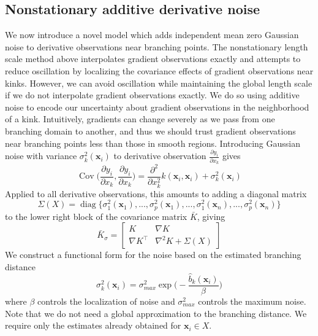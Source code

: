 \documentclass{article}
\newcommand{\mat}[1]{\begin{bmatrix}#1\end{bmatrix}}
\renewcommand{\vec}[1]{\mathbf{#1}}
\DeclareMathOperator{\Cov}{Cov}
\DeclareMathOperator{\diag}{diag}
\numberwithin{equation}{section}
\begin{document}
\subsection{Nonstationary additive derivative noise}
We now introduce a novel model which adds independent mean zero Gaussian noise to derivative observations near branching points. The nonstationary length scale method above interpolates gradient observations exactly and attempts to reduce oscillation by localizing the covariance effects of gradient observations near kinks. However, we can avoid oscillation while maintaining the global length scale if we do not interpolate gradient observations exactly. We do so using additive noise to encode our uncertainty about gradient observations in the neighborhood of a kink. Intuitively, gradients can change severely as we pass from one branching domain to another, and thus we should trust gradient observations near branching points less than those in smooth regions. Introducing Gaussian noise with variance $\sigma^2_k(\vec{x}_i)$ to derivative observation $\frac{\partial y_i}{\partial x_k}$ gives
$$ \Cov\Big(\frac{\partial y_i}{\partial x_k}, \frac{\partial y_i}{\partial x_k}\Big) = \frac{\partial^2}{\partial x_k^2} k(\vec{x}_i, \vec{x}_i) + \sigma^2_k(\vec{x}_i) $$
Applied to all derivative observations, this amounts to adding a diagonal matrix
$$\Sigma(X) = \diag\{\sigma^2_1(\vec{x}_1),...,\sigma^2_p(\vec{x}_1),...,\sigma^2_1(\vec{x}_n),...,\sigma^2_p(\vec{x}_n)\}$$
to the lower right block of the covariance matrix $\bar{K}$, giving
$$ \bar{K}_\sigma = \mat{K & \nabla K \\ \nabla K^\top & \nabla^2 K + \Sigma(X)} $$
We construct a functional form for the noise based on the estimated branching distance
\begin{equation}
  \sigma^2_k(\vec{x}_i) = \sigma^2_{max} \exp\bigg(- \frac{\hat{b}_k(\vec{x}_i)}{\beta}\bigg) \label{eq:noise}
\end{equation}
where $\beta$ controls the localization of noise and $\sigma_{max}^2$ controls the maximum noise. Note that we do not need a global approximation to the branching distance. We require only the estimates already obtained for $\vec{x}_i \in X$.
\end{document}
